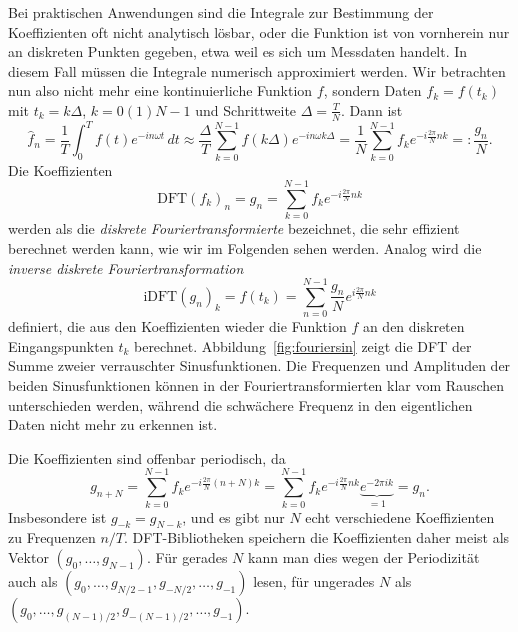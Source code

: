 Bei praktischen Anwendungen sind die Integrale zur Bestimmung der
Koeffizienten oft nicht analytisch lösbar, oder die Funktion ist von
vornherein nur an diskreten Punkten gegeben, etwa weil es sich um
Messdaten handelt. In diesem Fall müssen die Integrale numerisch
approximiert werden. Wir betrachten nun also nicht mehr eine
kontinuierliche Funktion $f$, sondern Daten $f_k = f(t_k)$ mit
$t_k=k\Delta$, $k=0(1)N-1$ und Schrittweite $\Delta =
\frac{T}{N}$. Dann ist
\begin{equation}
  \hat{f}_n = \frac{1}{T}\int_0^T f(t)e^{-i n\omega t}\, dt
  \approx
  \frac{\Delta}{T}\sum_{k=0}^{N-1} f(k\Delta) e^{-i n\omega k\Delta}
  =
  \frac{1}{N}\sum_{k=0}^{N-1} f_k e^{-i\frac{2\pi}{N} n k} =: \frac{g_n}{N}.
\end{equation}
Die Koeffizienten
\begin{equation}
  \label{eq:dft}
  \text{DFT}(f_k)_n = g_n = \sum_{k=0}^{N-1} f_k e^{-i \frac{2\pi}{N} n k}
\end{equation}
werden als die \emph{diskrete Fouriertransformierte} bezeichnet, die
sehr effizient berechnet werden kann, wie wir im Folgenden sehen
werden. Analog wird die \emph{inverse diskrete Fouriertransformation}
\begin{equation}
  \label{eq:idft}
  \text{iDFT}(g_n)_k = f(t_k) = \sum_{n=0}^{N-1} \frac{g_n}{N} e^{i \frac{2\pi}{N} n k}
\end{equation}
definiert, die aus den Koeffizienten wieder die Funktion $f$ an den
diskreten Eingangspunkten $t_k$
berechnet. Abbildung~\ref{fig:fouriersin} zeigt die DFT der Summe
zweier verrauschter Sinusfunktionen. Die Frequenzen und Amplituden der
beiden Sinusfunktionen können in der Fouriertransformierten klar vom
Rauschen unterschieden werden, während die schwächere Frequenz in den
eigentlichen Daten nicht mehr zu erkennen ist.

Die Koeffizienten sind offenbar periodisch, da
\begin{equation}
  \label{eq:dftper}
  g_{n+N} = \sum_{k=0}^{N-1} f_k e^{-i\frac{2\pi}{N} (n + N) k} =
  \sum_{k=0}^{N-1} f_k e^{-i\frac{2\pi}{N} n k} \underbrace{e^{-2\pi i k}}_{=1} = g_n.
\end{equation}
Insbesondere ist $g_{-k} = g_{N-k}$, und es gibt nur $N$ echt
verschiedene Koeffizienten zu Frequenzen $n/T$. DFT-Bibliotheken
speichern die Koeffizienten daher meist als Vektor
$(g_{0},\ldots,g_{N-1})$. Für gerades $N$ kann man dies wegen der Periodizität auch als $(g_{0},\ldots,g_{N/2-1},g_{-N/2},\ldots,g_{-1})$ lesen, für ungerades $N$ als
$(g_{0},\ldots,g_{(N-1)/2},g_{-(N-1)/2},\ldots,g_{-1})$.

